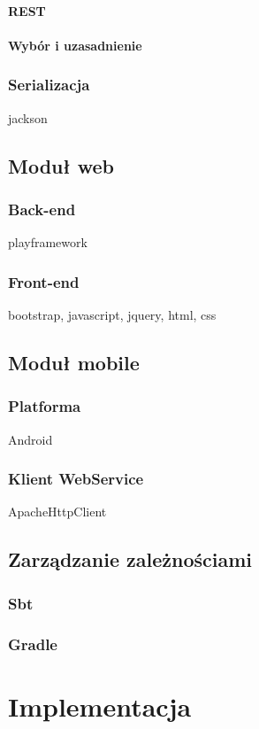 \documentclass[11pt]{aghdpl}
\begin{document}
\subsubsection{REST}
\subsubsection{Wybór i uzasadnienie}
\subsection{Serializacja}
jackson
\section{Moduł web}
\subsection{Back-end}
playframework
\subsection{Front-end}
bootstrap, javascript, jquery, html, css
\section{Moduł mobile}
\subsection{Platforma}
Android
\subsection{Klient WebService}
ApacheHttpClient
\section{Zarządzanie zależnościami}
\subsection{Sbt}
\subsection{Gradle}


\chapter{Implementacja}
\label{cha:implementacja}
\end{document}
